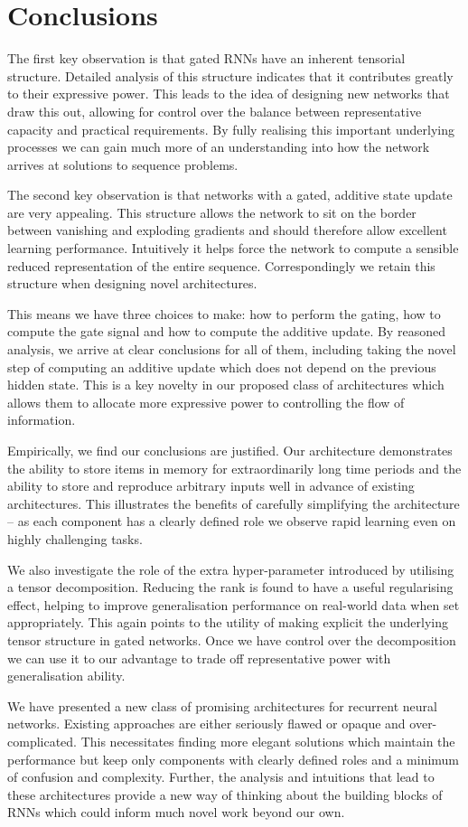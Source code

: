 \chapter{Conclusions}\label{C:con}
The first key observation is that gated RNNs have an inherent tensorial structure. Detailed
analysis of this structure indicates that it contributes greatly to their expressive power.
This leads to the idea of designing new networks that draw this out, allowing
for control over the balance between representative capacity and practical requirements.
By fully realising this important underlying processes we can 
gain much more of an understanding into how the network arrives at solutions to sequence
problems.

The second key observation is that networks with a gated, additive state update are very appealing.
This structure allows the network to sit on the border between vanishing and
exploding gradients and should therefore allow excellent learning performance. 
Intuitively it helps force the network to compute a sensible reduced representation of the
entire sequence. Correspondingly we
retain this structure when designing novel architectures.

This means we have three choices to make: how to perform
the gating, how to compute the gate signal and how to compute the additive update. By reasoned analysis,
we arrive at clear conclusions for all of them, including taking the novel step of computing an
additive update which does not depend on the previous hidden state. This is a key novelty in our
proposed class of architectures which allows them to allocate more expressive power to controlling
the flow of information.  

Empirically, we find our conclusions are justified. Our architecture
demonstrates the ability to store items in
memory for extraordinarily
long time periods and the ability to store and reproduce arbitrary inputs well in advance
of existing architectures. This illustrates the benefits of carefully
simplifying the architecture -- as each
component has a clearly defined role we observe rapid learning even on highly challenging tasks.

We also investigate the role of the extra hyper-parameter introduced by utilising a tensor decomposition.
Reducing the rank is found to have a useful regularising effect, helping to improve generalisation 
performance on real-world data when
set appropriately. This again points to the utility of making explicit the underlying tensor structure
in gated networks. Once we have control over the decomposition we can use it to our advantage to
trade off representative power with generalisation ability.

We have presented a new class of promising architectures for recurrent neural networks.
Existing approaches are either seriously flawed or opaque and over-complicated.
This necessitates finding more elegant solutions which maintain the performance but keep
only components with clearly defined roles and a minimum of confusion and complexity.
Further, the analysis and intuitions that lead to these architectures provide a new way
of thinking about the building blocks of RNNs which could inform much novel work beyond
our own.
